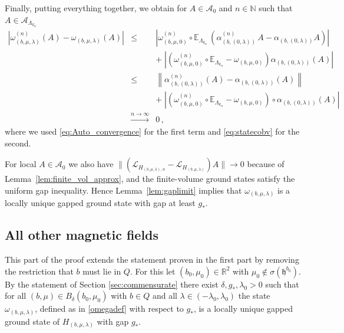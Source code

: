 \documentclass[a4paper]{article}
\newcommand{\E}{\mathbb{E}}
\newcommand{\w}{\omega}
\newcommand{\N}{\mathbb{N}}
\newcommand{\mA}{\mathcal{A}}
\newcommand{\R}{\mathbb{R}}
\theoremstyle{plain}
\theoremstyle{definition}
\theoremstyle{remark}
\renewcommand{\(}{\left(}
\renewcommand{\)}{\right)}
\begin{document}
Finally, putting everything together, we obtain for $A\in\mA_0$ and $n\in \N$ such that $A \in \mA_{\Lambda_{k_n}}$
\begin{eqnarray*}
    \left|\w_{(b,\mu,\lambda)}^{(n)}(A)-\w_{(b,\mu,\lambda)}(A)\right|
    &\leq &
    \left|\w_{(b,\mu,0)}^{(n)}\circ \E_{\Lambda_{k_n}}\,  \left( \alpha_{(b,(0,\lambda))}^{(n)}\,A - \alpha_{(b,(0,\lambda))} A\right) \right|  
    \\
    &&+\;
    \left|\left( \w_{(b,\mu,0)}^{(n)}\circ \E_{\Lambda_{k_n}} - \w_{(b,\mu,0)}\right)  \alpha_{(b,(0,\lambda))} (A)  \right|
    \\
    &\leq &
    \left\| \alpha_{(b,(0,\lambda))}^{(n)}(A) -\alpha_{(b,(0,\lambda))}(A)\right\| 
    \\
    &&+\;
    \left|\left(\w_{(b,\mu,0)}^{(n)} \circ \E_{\Lambda_{k_n}} - \w_{(b,\mu,0)} \right) \circ \alpha_{(b,(0,\lambda))} (A)\right|
    \\
    &\stackrel{n\to\infty}{\longrightarrow}&0\,,
\end{eqnarray*}
where we used \eqref{eq:Auto_convergence} for the first term and \eqref{eq:statecobv}
for the second.

 For local  $A\in\mA_0$ we also have $ \|(\mathcal L_{H_{(b,\mu,\lambda),n}}-\mathcal L_{H_{(b,\mu,\lambda)}})A\|\to0$ because of Lemma~\ref{lem:finite_vol_approx}, and the finite-volume ground states satisfy the uniform gap inequality. Hence Lemma~\ref{lem:gaplimit} implies that $\omega_{(b,\mu,\lambda)}$ is a locally unique gapped ground state with gap at least $g_*$.
 

\subsection{All other  magnetic fields} \label{sec:incommensurate}

This part of the proof extends the statement proven in the first part by removing the restriction that $b$ must lie in $Q$. For this let $(b_0,\mu_0)\in \R^2 $ with $\mu_0\notin \sigma(\mathfrak{h}^{b_0})$. By the statement of Section \ref{sec:commensurate} there exist $\delta,g_*,\lambda_0>0$ such that for all $(b,\mu)\in B_{\delta}(b_0,\mu_0)$ with $b\in Q$ and all $\lambda \in (-\lambda_0,\lambda_0)$ the state $\w_{(b,\mu,\lambda)}$, defined as in \eqref{omegadef} with respect to $g_*$, is a locally unique gapped ground state of $H_{(b,\mu,\lambda)}$ with gap $g_*$.
\end{document}
